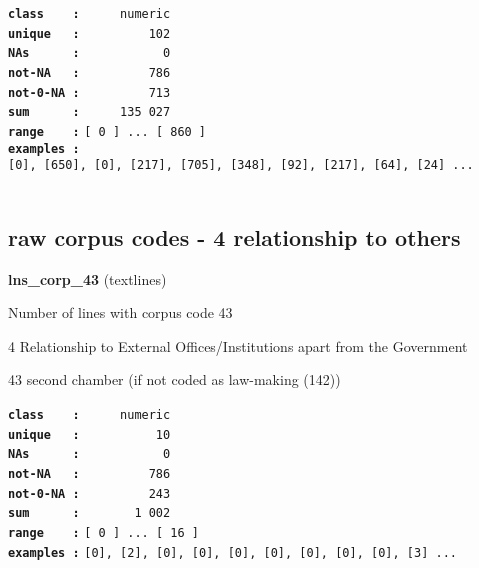 \documentclass[]{article}
\begin{document}
\textbf{\texttt{class\ \ \ \ :}} \texttt{~~~~~numeric}\\
\textbf{\texttt{unique\ \ \ :}} \texttt{~~~~~~~~~102}\\
\textbf{\texttt{NAs\ \ \ \ \ \ :}} \texttt{~~~~~~~~~~~0}\\
\textbf{\texttt{not-NA\ \ \ :}} \texttt{~~~~~~~~~786}\\
\textbf{\texttt{not-0-NA\ :}} \texttt{~~~~~~~~~713}\\
\textbf{\texttt{sum\ \ \ \ \ \ :}} \texttt{~~~~~135~027}\\
\textbf{\texttt{range\ \ \ \ :}}
\texttt{{[}\ 0\ {]}\ ...\ {[}\ 860\ {]}}\\
\textbf{\texttt{examples\ :}}
\texttt{{[}0{]},\ {[}650{]},\ {[}0{]},\ {[}217{]},\ {[}705{]},\ {[}348{]},\ {[}92{]},\ {[}217{]},\ {[}64{]},\ {[}24{]}\ ...}\\

~

\subsection{raw corpus codes - 4 relationship to
others}\label{raw-corpus-codes---4-relationship-to-others}

\textbf{lns\_corp\_43} (textlines)

Number of lines with corpus code 43

4 Relationship to External Offices/Institutions apart from the
Government

43 second chamber (if not coded as law-making (142))

\textbf{\texttt{class\ \ \ \ :}} \texttt{~~~~~numeric}\\
\textbf{\texttt{unique\ \ \ :}} \texttt{~~~~~~~~~~10}\\
\textbf{\texttt{NAs\ \ \ \ \ \ :}} \texttt{~~~~~~~~~~~0}\\
\textbf{\texttt{not-NA\ \ \ :}} \texttt{~~~~~~~~~786}\\
\textbf{\texttt{not-0-NA\ :}} \texttt{~~~~~~~~~243}\\
\textbf{\texttt{sum\ \ \ \ \ \ :}} \texttt{~~~~~~~1~002}\\
\textbf{\texttt{range\ \ \ \ :}}
\texttt{{[}\ 0\ {]}\ ...\ {[}\ 16\ {]}}\\
\textbf{\texttt{examples\ :}}
\texttt{{[}0{]},\ {[}2{]},\ {[}0{]},\ {[}0{]},\ {[}0{]},\ {[}0{]},\ {[}0{]},\ {[}0{]},\ {[}0{]},\ {[}3{]}\ ...}\\

~
\end{document}
